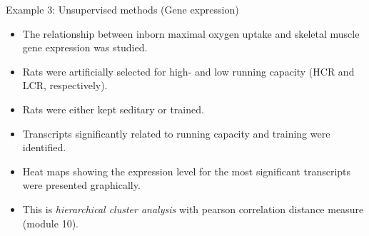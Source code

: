 \documentclass[10pt,ignorenonframetext,]{beamer}
\providecommand{\tightlist}{%
  \setlength{\itemsep}{0pt}\setlength{\parskip}{0pt}}
\begin{document}
\begin{frame}{Example 3: Unsupervised methods (Gene expression)}
\protect\hypertarget{example-3-unsupervised-methods-gene-expression}{}

\vspace{2mm}

\begin{itemize}
\tightlist
\item
  The relationship between inborn maximal oxygen uptake and skeletal
  muscle gene expression was studied.
\end{itemize}

\vspace{1mm}

\begin{itemize}
\tightlist
\item
  Rats were artificially selected for high- and low running capacity
  (HCR and LCR, respectively).
\end{itemize}

\vspace{1mm}

\begin{itemize}
\tightlist
\item
  Rats were either kept seditary or trained.
\end{itemize}

\vspace{1mm}

\begin{itemize}
\tightlist
\item
  Transcripts significantly related to running capacity and training
  were identified. 
\end{itemize}

\vspace{1mm}

\begin{itemize}
\tightlist
\item
  Heat maps showing the expression level for the most significant
  transcripts were presented graphically.
\end{itemize}

\vspace{1mm}

\begin{itemize}
\tightlist
\item
  This is \emph{hierarchical cluster analysis} with pearson correlation
  distance measure (module 10).
\end{itemize}

\end{frame}
\end{document}
